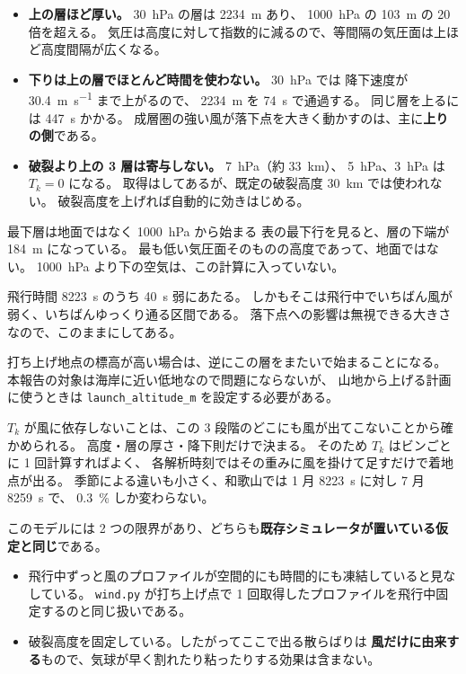 \begin{itemize}
  \item \textbf{上の層ほど厚い。} \SI{30}{\hecto\pascal} の層は \SI{2234}{\metre} あり、
        \SI{1000}{\hecto\pascal} の \SI{103}{\metre} の 20 倍を超える。
        気圧は高度に対して指数的に減るので、等間隔の気圧面は上ほど高度間隔が広くなる。
  \item \textbf{下りは上の層でほとんど時間を使わない。} \SI{30}{\hecto\pascal} では
        降下速度が \SI{30.4}{\metre\per\second} まで上がるので、
        \SI{2234}{\metre} を \SI{74}{\second} で通過する。
        同じ層を上るには \SI{447}{\second} かかる。
        成層圏の強い風が落下点を大きく動かすのは、主に\textbf{上りの側}である。
  \item \textbf{破裂より上の 3 層は寄与しない。} \SI{7}{\hecto\pascal}（約 \SI{33}{\kilo\metre}）、
        \SI{5}{\hecto\pascal}、\SI{3}{\hecto\pascal} は $T_k = 0$ になる。
        取得はしてあるが、既定の破裂高度 \SI{30}{\kilo\metre} では使われない。
        破裂高度を上げれば自動的に効きはじめる。
\end{itemize}

\begin{whybox}{最下層は地面ではなく \SI{1000}{\hecto\pascal} から始まる}
表の最下行を見ると、層の下端が \SI{184}{\metre} になっている。
最も低い気圧面そのものの高度であって、地面ではない。
\SI{1000}{\hecto\pascal} より下の空気は、この計算に入っていない。

飛行時間 \SI{8223}{\second} のうち \SI{40}{\second} 弱にあたる。
しかもそこは飛行中でいちばん風が弱く、いちばんゆっくり通る区間である。
落下点への影響は無視できる大きさなので、このままにしてある。

打ち上げ地点の標高が高い場合は、逆にこの層をまたいで始まることになる。
本報告の対象は海岸に近い低地なので問題にならないが、
山地から上げる計画に使うときは \texttt{launch\_altitude\_m} を設定する必要がある。
\end{whybox}

$T_k$ が風に依存しないことは、この 3 段階のどこにも風が出てこないことから確かめられる。
高度・層の厚さ・降下則だけで決まる。
そのため $T_k$ はビンごとに 1 回計算すればよく、
各解析時刻ではその重みに風を掛けて足すだけで着地点が出る。
季節による違いも小さく、和歌山では 1 月 \SI{8223}{\second} に対し 7 月 \SI{8259}{\second} で、
\SI{0.3}{\percent} しか変わらない。

このモデルには 2 つの限界があり、どちらも\textbf{既存シミュレータが置いている仮定と同じ}である。

\begin{itemize}
  \item 飛行中ずっと風のプロファイルが空間的にも時間的にも凍結していると見なしている。
        \texttt{wind.py} が打ち上げ点で 1 回取得したプロファイルを飛行中固定するのと同じ扱いである。
  \item 破裂高度を固定している。したがってここで出る散らばりは
        \textbf{風だけに由来する}もので、気球が早く割れたり粘ったりする効果は含まない。
\end{itemize}

